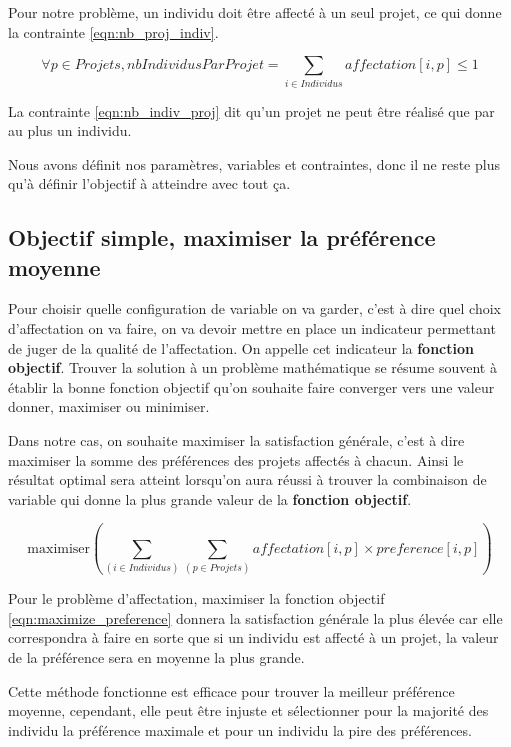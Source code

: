 \documentclass[final,poster]{polytech/polytech}
\begin{document}
Pour notre problème, un individu doit être affecté à un seul projet, ce qui donne la contrainte \eqref{eqn:nb_proj_indiv}.

\begin{equation}
\label{eqn:nb_indiv_proj}
\forall p \in Projets, nbIndividusParProjet= \sum_{i \in Individus} affectation[i,p] \leqslant 1
\end{equation}

La contrainte \eqref{eqn:nb_indiv_proj} dit qu'un projet ne peut être réalisé que par au plus un individu.

Nous avons définit nos paramètres, variables et contraintes, donc il ne reste plus qu'à définir l'objectif à atteindre avec tout ça.
\subsection{Objectif simple, maximiser la préférence moyenne}
\label{sec:max_pref_moy}

Pour choisir quelle configuration de variable on va garder, c'est à dire quel choix d'affectation on va faire, on va devoir mettre en place un indicateur permettant de juger de la qualité de l'affectation.
On appelle cet indicateur la \textbf{fonction objectif}.
Trouver la solution à un problème mathématique se résume souvent à établir la bonne fonction objectif qu'on souhaite faire converger vers une valeur donner, maximiser ou minimiser.


Dans notre cas, on souhaite maximiser la satisfaction générale, c'est à dire maximiser la somme des préférences des projets affectés à chacun. Ainsi le résultat optimal sera atteint lorsqu'on aura réussi à trouver la combinaison de variable qui donne la plus grande valeur de la \textbf{fonction objectif}.

\begin{equation}
\label{eqn:maximize_preference}
\text{maximiser} \left( \sum_{(i \in Individus)} \sum_{(p\in Projets)} affectation[i,p]\times preference[i,p] \right)
\end{equation}

Pour le problème d'affectation, maximiser la fonction objectif \eqref{eqn:maximize_preference} donnera la satisfaction générale la plus élevée car elle correspondra à faire en sorte que si un individu est affecté à un projet, la valeur de la préférence sera en moyenne la plus grande.

Cette méthode fonctionne est efficace pour trouver la meilleur préférence moyenne, cependant, elle peut être injuste et sélectionner pour la majorité des individu la préférence maximale et pour un individu la pire des préférences.
\end{document}
